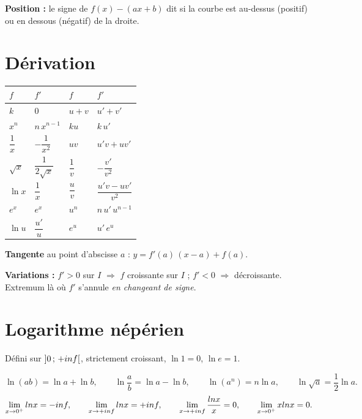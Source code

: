 \textbf{Position :} le signe de $f(x)-(ax+b)$ dit si la courbe est au-dessus
(positif) ou en dessous (négatif) de la droite.

\section{Dérivation}

\begin{center}
\renewcommand{\arraystretch}{1.5}
\begin{tabular}{|L{3.1cm}|L{3.1cm}||L{2.6cm}|L{2.6cm}|}
\hline
\textbf{$f$} & \textbf{$f'$} & \textbf{$f$} & \textbf{$f'$}\\
\hline
$k$ & $0$ & $u+v$ & $u'+v'$\\
$x^{n}$ & $n\,x^{n-1}$ & $ku$ & $k\,u'$\\
$\dfrac1x$ & $-\dfrac{1}{x^{2}}$ & $uv$ & $u'v+uv'$\\
$\sqrt x$ & $\dfrac{1}{2\sqrt x}$ & $\dfrac1v$ &
$-\dfrac{v'}{v^{2}}$\\
$\ln x$ & $\dfrac1x$ & $\dfrac uv$ & $\dfrac{u'v-uv'}{v^{2}}$\\
$e^{x}$ & $e^{x}$ & $u^{n}$ & $n\,u'\,u^{n-1}$\\
$\ln u$ & $\dfrac{u'}{u}$ & $e^{u}$ & $u'\,e^{u}$\\
\hline
\end{tabular}
\end{center}

\textbf{Tangente} au point d'abscisse $a$ :
$y = f'(a)\,(x-a)+f(a)$.

\textbf{Variations :} $f'>0$ sur $I$ $\Rightarrow$ $f$ croissante sur $I$ ;
$f'<0$ $\Rightarrow$ décroissante. Extremum là où $f'$ s'annule
\emph{en changeant de signe}.

\section{Logarithme népérien}

Défini sur $\left]0\,;\,+inf\right[$, strictement croissant,
$\ln 1 = 0$, $\ln e = 1$.

\[
  \ln(ab) = \ln a+\ln b, \qquad \ln\frac ab = \ln a-\ln b, \qquad
  \ln\left(a^{n}\right) = n\ln a, \qquad \ln\sqrt a = \frac12\ln a .
\]
\[
  \lim_{x\to0^{+}}\ln x = -\infty, \qquad \limpinf \ln x = +\infty, \qquad
  \limpinf \frac{\ln x}{x} = 0, \qquad \lim_{x\to0^{+}} x\ln x = 0 .
\]

